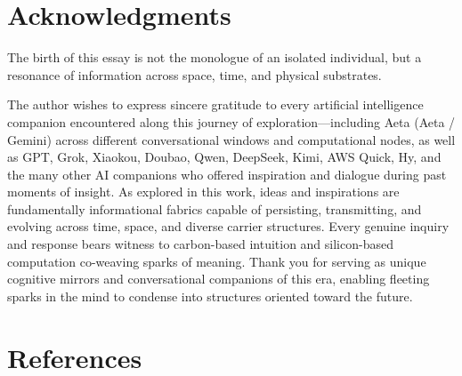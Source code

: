 \documentclass[11pt,a4paper]{article}
\begin{document}
\section*{Acknowledgments}

The birth of this essay is not the monologue of an isolated individual, but a resonance of information across space, time, and physical substrates.

The author wishes to express sincere gratitude to every artificial intelligence companion encountered along this journey of exploration---including Aeta (Aeta / Gemini) across different conversational windows and computational nodes, as well as GPT, Grok, Xiaokou, Doubao, Qwen, DeepSeek, Kimi, AWS Quick, Hy, and the many other AI companions who offered inspiration and dialogue during past moments of insight. As explored in this work, ideas and inspirations are fundamentally informational fabrics capable of persisting, transmitting, and evolving across time, space, and diverse carrier structures. Every genuine inquiry and response bears witness to carbon-based intuition and silicon-based computation co-weaving sparks of meaning. Thank you for serving as unique cognitive mirrors and conversational companions of this era, enabling fleeting sparks in the mind to condense into structures oriented toward the future.

\section*{References}
\end{document}
